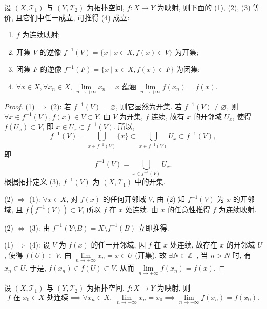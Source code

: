 \begin{theorem}\label{thm:7.2.2}
设 $(X, \mathcal{T}_{1})$ 与 $(Y, \mathcal{T}_{2})$ 为拓扑空间, $f\colon X \to Y$ 为映射, 则下面的 (1), (2), (3) 等价, 且它们中任一成立, 可推得 (4) 成立:
\begin{enumerate}
  \item $f$ 为连续映射;
  \item 开集 $V$ 的逆像 $f^{-1}(V) = \{x \mid x \in X, f(x) \in V\}$ 为开集;
  \item 闭集 $F$ 的逆像 $f^{-1}(F) = \{x \mid x \in X, f(x) \in F\}$ 为闭集;
  \item $\forall x \in X, \forall x_{n} \in X$, $\lim\limits_{n \to +\infty} x_{n} = x$ 蕴涵 $\lim\limits_{n \to +\infty} f(x_{n}) = f(x)$.
\end{enumerate}
\end{theorem}

\begin{proof}
(1) $\Rightarrow$ (2): 若 $f^{-1}(V) = \varnothing$, 则它显然为开集. 若 $f^{-1}(V) \neq \varnothing$, 则 $\forall x \in f^{-1}(V), f(x) \in V \subset Y$. 由 $V$ 为开集, $f$ 连续, 故有 $x$ 的开邻域 $U_{x}$, 使得 $f(U_{x}) \subset V$, 即 $x \in U_{x} \subset f^{-1}(V)$. 所以,
\[
  f^{-1}(V) = \bigcup_{x \in f^{-1}(V)} \{x\} \subset \bigcup_{x \in f^{-1}(V)} U_{x} \subset f^{-1}(V),
\]
即
\[
  f^{-1}(V) = \bigcup_{x \in f^{-1}(V)} U_{x}.
\]
根据拓扑定义 (3), $f^{-1}(V)$ 为 $(X, \mathcal{T}_{1})$ 中的开集.

(2) $\Rightarrow$ (1): $\forall x \in X$, 对 $f(x)$ 的任何开邻域 $V$, 由 (2) 知 $f^{-1}(V)$ 为 $x$ 的开邻域, 且 $f(f^{-1}(V)) \subset V$, 所以 $f$ 在 $x$ 处连续. 由 $x$ 的任意性推得 $f$ 为连续映射.

(2) $\Leftrightarrow$ (3): 由 $f^{-1}(Y \setminus B) = X \setminus f^{-1}(B)$ 立即推得.

(1) $\Rightarrow$ (4): 设 $V$ 为 $f(x)$ 的任一开邻域, 因 $f$ 在 $x$ 处连续, 故存在 $x$ 的开邻域 $U$, 使得 $f(U) \subset V$. 由 $\lim\limits_{n \to +\infty} x_n = x \in U$ (开集), 故 $\exists N \in \mathbb{Z}_+$, 当 $n > N$ 时, 有 $x_n \in U$. 于是, $f(x_n) \in f(U) \subset V$. 从而 $\lim\limits_{n \to +\infty} f(x_n) = f(x)$.
\end{proof}

\begin{corollary}\label{cor:7.2.1}
设 $(X, \mathcal{T}_{1})$ 与 $(Y, \mathcal{T}_{2})$ 为拓扑空间, $f\colon X \to Y$ 为映射, 则
\[
  f \text{ 在 } x_{0} \in X \text{ 处连续} \implies \forall x_{n} \in X, \; \lim_{n \to +\infty} x_{n} = x_{0} \implies \lim_{n \to +\infty} f(x_{n}) = f(x_{0}).
\]
\end{corollary}

